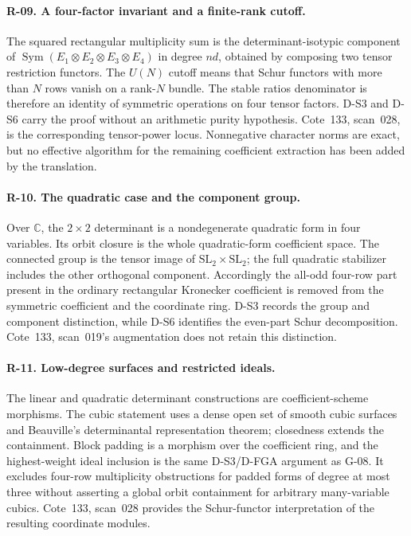 \paragraph{R-09. A four-factor invariant and a finite-rank cutoff.}
The squared rectangular multiplicity sum is the determinant-isotypic component of $\operatorname{Sym}(E_1\otimes E_2\otimes E_3\otimes E_4)$ in degree $nd$, obtained by composing two tensor restriction functors. The $U(N)$ cutoff means that Schur functors with more than $N$ rows vanish on a rank-$N$ bundle. The stable ratios denominator is therefore an identity of symmetric operations on four tensor factors. D-S3 and D-S6 carry the proof without an arithmetic purity hypothesis. Cote~133, scan~028, is the corresponding tensor-power locus. Nonnegative character norms are exact, but no effective algorithm for the remaining coefficient extraction has been added by the translation.

\paragraph{R-10. The quadratic case and the component group.}
Over $\mathbb C$, the $2\times2$ determinant is a nondegenerate quadratic form in four variables. Its orbit closure is the whole quadratic-form coefficient space. The connected group is the tensor image of $\mathrm{SL}_2\times\mathrm{SL}_2$; the full quadratic stabilizer includes the other orthogonal component. Accordingly the all-odd four-row part present in the ordinary rectangular Kronecker coefficient is removed from the symmetric coefficient and the coordinate ring. D-S3 records the group and component distinction, while D-S6 identifies the even-part Schur decomposition. Cote~133, scan~019's augmentation does not retain this distinction.

\paragraph{R-11. Low-degree surfaces and restricted ideals.}
The linear and quadratic determinant constructions are coefficient-scheme morphisms. The cubic statement uses a dense open set of smooth cubic surfaces and Beauville's determinantal representation theorem; closedness extends the containment. Block padding is a morphism over the coefficient ring, and the highest-weight ideal inclusion is the same D-S3/D-FGA argument as G-08. It excludes four-row multiplicity obstructions for padded forms of degree at most three without asserting a global orbit containment for arbitrary many-variable cubics. Cote~133, scan~028 provides the Schur-functor interpretation of the resulting coordinate modules.

